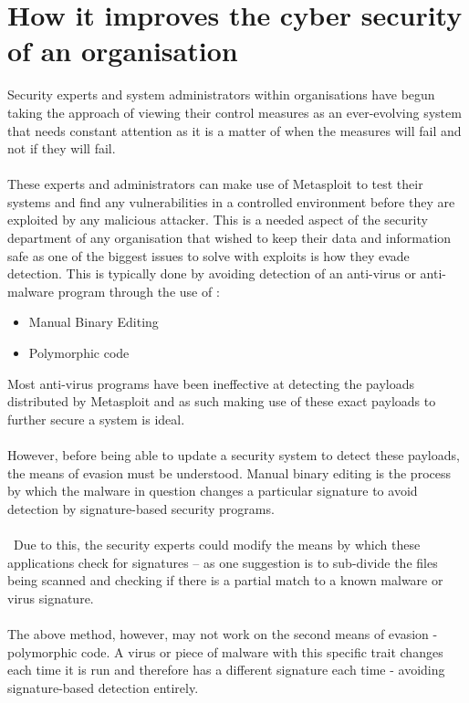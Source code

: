 \documentclass[a4paper, 12pt, titlepage]{report}
\begin{document}
\section{How it improves the cyber security of an organisation}
Security experts and system administrators within organisations have begun taking the approach of viewing their control measures as an ever-evolving system that needs constant attention as it is a matter of when the measures will fail and not if they will fail.\cite{usesEvade} 
\\\\
These experts and administrators can make use of Metasploit to test their systems and find any vulnerabilities in a controlled environment before they are exploited by any malicious attacker. This is a needed aspect of the security department of any organisation that wished to keep their data and information safe as one of the biggest issues to solve with exploits is how they evade detection. This is typically done by avoiding detection of an anti-virus or anti-malware program through the use of \cite{usesEvade, testIDS}:
\begin{itemize}
    \item Manual Binary Editing
    \item Polymorphic code
\end{itemize}
Most anti-virus programs have been ineffective at detecting the payloads distributed by Metasploit and as such making use of these exact payloads to further secure a system is ideal.\cite{testIDS}
\\\\
However, before being able to update a security system to detect these payloads, the means of evasion must be understood. Manual binary editing is the process by which the malware in question changes a particular signature to avoid detection by signature-based security programs.\cite{usesEvade}
\\\\\
Due to this, the security experts could modify the means by which these applications check for signatures – as one suggestion is to sub-divide the files being scanned and checking if there is a partial match to a known malware or virus signature.\cite{usesEvade} 
\\\\
The above method, however, may not work on the second means of evasion -polymorphic code. A virus or piece of malware with this specific trait changes each time it is run and therefore has a different signature each time - avoiding signature-based detection entirely. \cite{usesEvade}
\end{document}
